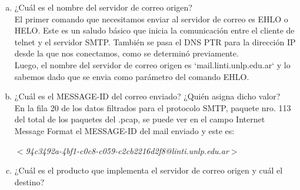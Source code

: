 \documentclass[osajnl,twocolumn,showpacs,superscriptaddress,10pt]{revtex4-1} %
\begin{document}
\begin{enumerate}[a)]
  \item ¿Cuál es el nombre del servidor de correo origen? \\

  El primer comando que necesitamos enviar al servidor de correo es EHLO o HELO. Este es un saludo básico que inicia la comunicación entre el cliente de telnet y el servidor SMTP. También se pasa el DNS PTR para la dirección IP desde la que nos conectamos, como se determinó previamente. \\

  Luego, el nombre del servidor de correo origen es `mail.linti.unlp.edu.ar` y lo sabemos dado que se envia como parámetro del comando EHLO. \\

  \item ¿Cuál es el MESSAGE-ID del correo enviado? ¿Quién asigna dicho valor? \\

  En la fila 20 de los datos filtrados para el protocolo SMTP, paquete nro. 113 del total de los paquetes del .pcap, se puede ver en el campo Internet Message Format el MESSAGE-ID del mail enviado y este es:
  
  \textit{$<$94c3492a-4bf1-c0c8-c059-c2cb2216d2f8@linti.unlp.edu.ar$>$} \\
  
  \item ¿Cuál es el producto que implementa el servidor de correo origen y cuál el destino? \\
  
  

\end{enumerate}
\end{document}
